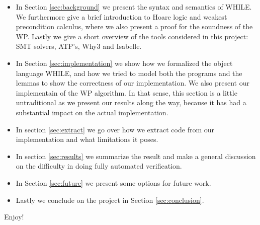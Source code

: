 \begin{itemize}
  \item In Section \ref{sec:background} we present the syntax and semantics of WHILE.
        We furthermore give a brief introduction to Hoare logic and weakest precondition calculus, where we also present a proof for the soundness of the WP.
        Lastly we give a short overview of the tools considered in this project: SMT solvers, ATP's, Why3 and Isabelle.
  \item In Section \ref{sec:implementation} we show how we formalized the object language WHILE, and how we tried to model both the programs and the lemmas to show the correctness of our implementation. We also present our implementain of the WP algorithm.
        In that sense, this section is a little untraditional as we present our results along the way, because it has had a substantial impact on the actual implementation.
  \item In section \ref{sec:extract} we go over how we extract code from our implementation and what limitations it poses.
  \item In section \ref{sec:results} we summarize the result and make a general discussion on the difficulty in doing fully automated verification.
  \item In Section \ref{sec:future} we present some options for future work.
  \item Lastly we conclude on the project in Section \ref{sec:conclusion}.
\end{itemize}

Enjoy!

